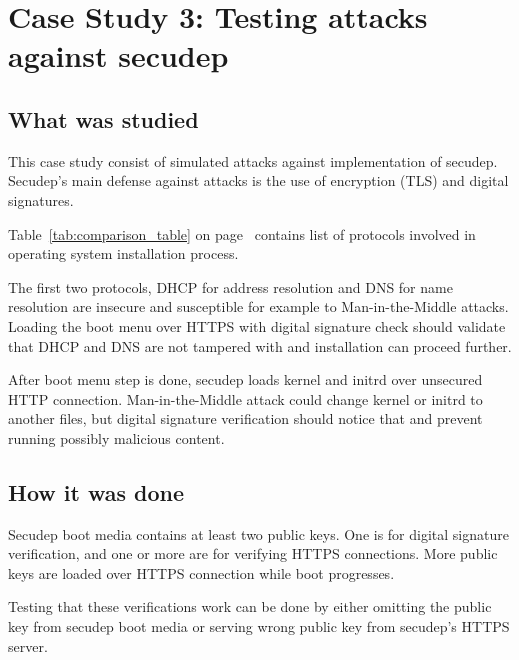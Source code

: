 \section{Case Study 3: Testing attacks against secudep}
\label{sec:casestudy3}

\subsection{What was studied}

This case study consist of simulated attacks against implementation of
secudep. Secudep's main defense against attacks is the use of
encryption (TLS) and digital signatures.

Table~\ref{tab:comparison_table} on
page~\pageref{tab:comparison_table} contains list of protocols
involved in operating system installation process.

The first two protocols, DHCP for address resolution and DNS for name
resolution are insecure and susceptible for example to
Man-in-the-Middle attacks. Loading the boot menu over HTTPS with
digital signature check should validate that DHCP and DNS are not
tampered with and installation can proceed further.

After boot menu step is done, secudep loads kernel and initrd over
unsecured HTTP connection. Man-in-the-Middle attack could change
kernel or initrd to another files, but digital signature verification
should notice that and prevent running possibly malicious content.


\subsection{How it was done}

Secudep boot media contains at least two public keys. One is for
digital signature verification, and one or more are for verifying
HTTPS connections. More public keys are loaded over HTTPS connection
while boot progresses.

Testing that these verifications work can be done by either omitting
the public key from secudep boot media or serving wrong public key
from secudep's HTTPS server.

